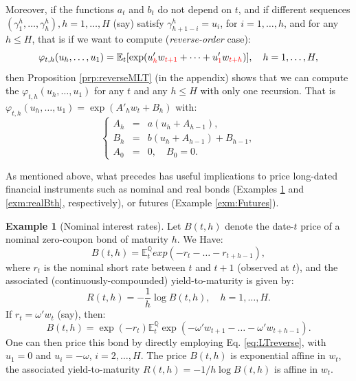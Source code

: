 \documentclass[
  12pt,
]{book}
\theoremstyle{definition}
\theoremstyle{definition}
\newtheorem{example}{Example}[chapter]
\theoremstyle{definition}
\theoremstyle{definition}
\theoremstyle{remark}
\begin{document}
Moreover, if the functions \(a_{t}\) and \(b_{t}\) do not depend on \(t\), and if different sequences \((\gamma^h_1,\dots,\gamma^h_h), h=1,\dots,H\) (say) satisfy \(\gamma^h_{h+1-i} = u_i\), for
\(i=1,\dots,h\), and for any \(h \leq H\), that is if we want to compute (\emph{reverse-order} case):
\begin{equation}
\varphi_{t,h}(u_h,\dots,u_1)=\mathbb{E}_t[\exp(u'_{{\color{red}h}} w_{{\color{red}t+1}}+\dots+u'_{{\color{red}1}} w_{{\color{red}t+h}})],
\quad h=1,\dots,H,\label{eq:LTreverse}
\end{equation}
then Proposition \ref{prp:reverseMLT} (in the appendix) shows that we can compute the \(\varphi_{t,h}(u_h,\dots,u_1)\) for any \(t\) and any \(h \leq H\) with only one recursion. That is \(\varphi_{t,h}(u_h,\dots,u_1)=\exp(A'_hw_t+B_h)\) with:
\begin{equation*}
\left\{
\begin{array}{ccl}
A_{h} &=& a(u_{h} + A_{h-1}), \\
B_{h} &=& b(u_{h} + A_{h-1}) + B_{h-1}, \\
A_{0} &=& 0,\quad  B_{0} = 0.
\end{array}
\right.
\end{equation*}

As mentioned above, what precedes has useful implications to price long-dated financial instruments such as nominal and real bonds (Examples \ref{exm:nominalBth} and \ref{exm:realBth}, respectively), or futures (Example \ref{exm:Futures}).

\begin{example}[Nominal interest rates]
\protect\hypertarget{exm:nominalBth}{}\label{exm:nominalBth}Let \(B(t,h)\) denote the date-\(t\) price of a nominal zero-coupon bond of maturity \(h\). We Have:
\begin{equation}
B(t,h) = \mathbb{E}^{\mathbb{Q}}_t exp (-r_{t}-\dots-r_{t+h-1}),\label{eq:stdbond}
\end{equation}
where \(r_{t}\) is the nominal short rate between \(t\) and \(t+1\) (observed at \(t\)), and the associated (continuously-compounded) yield-to-maturity is given by:
\begin{equation}
R(t,h) = -  \frac{1}{h}   \log   B(t,h), \quad   h=1,\dots,H.
\end{equation}
If \(r_t = \omega'w_t\) (say), then:
\[
B(t,h) = \exp(-r_{t}) \mathbb{E}^{\mathbb{Q}}_t \exp(-\omega' w_{t+1} - \dots - \omega' w_{t+h-1}).
\]
One can then price this bond by directly employing Eq. \eqref{eq:LTreverse}, with \(u_1 = 0\) and \(u_i = - \omega\), \(i = 2,\dots, H\).
The price \(B(t,h)\) is exponential affine in \(w_t\), the associated yield-to-maturity \(R(t,h)=-1/h\log B(t,h)\) is affine in \(w_t\).
\end{example}
\end{document}
